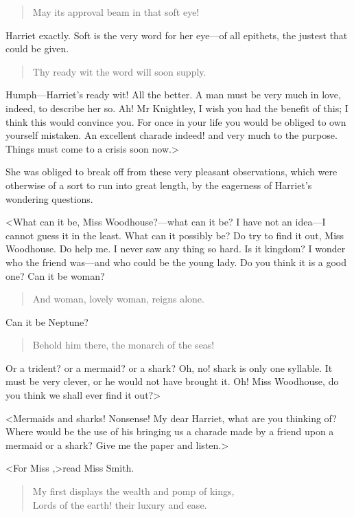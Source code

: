 \begin{quote}
May its approval beam in that soft eye!
\end{quote}


Harriet exactly. Soft is the very word for her eye—of all epithets, the justest that could be given.

\begin{quote}
Thy ready wit the word will soon supply.
\end{quote}


Humph—Harriet's ready wit! All the better. A man must be very much in love, indeed, to describe her so. Ah! Mr Knightley, I wish you had the benefit of this; I think this would convince you. For once in your life you would be obliged to own yourself mistaken. An excellent charade indeed! and very much to the purpose. Things must come to a crisis soon now.>

She was obliged to break off from these very pleasant observations, which were otherwise of a sort to run into great length, by the eagerness of Harriet's wondering questions.

<What can it be, Miss Woodhouse?—what can it be? I have not an idea—I cannot guess it in the least. What can it possibly be? Do try to find it out, Miss Woodhouse. Do help me. I never saw any thing so hard. Is it kingdom? I wonder who the friend was—and who could be the young lady. Do you think it is a good one? Can it be woman?

\begin{quote}
And woman, lovely woman, reigns alone.
\end{quote}

Can it be Neptune?

\begin{quote}
Behold him there, the monarch of the seas!
\end{quote}


Or a trident? or a mermaid? or a shark? Oh, no! shark is only one syllable. It must be very clever, or he would not have brought it. Oh! Miss Woodhouse, do you think we shall ever find it out?>

<Mermaids and sharks! Nonsense! My dear Harriet, what are you thinking of? Where would be the use of his bringing us a charade made by a friend upon a mermaid or a shark? Give me the paper and listen.>

<For Miss \doubleemdash ,>read Miss Smith.

\begin{verse}
\begin{altverse}
My first displays the wealth and pomp of kings,\\
    Lords of the earth! their luxury and ease.
\end{altverse}
\end{verse}

